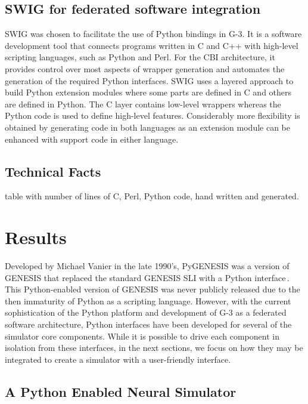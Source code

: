 \documentclass[12pt]{article}
\begin{document}
\subsection{SWIG for federated software integration}

SWIG was chosen to facilitate the use of Python bindings in G-3. It is
a software development tool that connects programs written in C and
C++ with high-level scripting languages, such as Python and Perl. For
the CBI architecture, it provides control over most aspects of wrapper
generation and automates the generation of the required Python
interfaces. SWIG uses a layered approach to build Python extension
modules where some parts are defined in C and
others are defined in Python. The C layer contains low-level wrappers
whereas the Python code is used to define high-level features.
Considerably more flexibility is obtained by generating code in both
languages as an extension module can be enhanced with support code in
either language.

\subsection{Technical Facts}

table with number of lines of C, Perl, Python code, hand written and
generated.

\section{Results}

Developed by Michael Vanier in the late 1990's, PyGENESIS was a
version of GENESIS that replaced the standard GENESIS SLI with a
Python interface\,\cite{vanier97:_genes_python}.  This Python-enabled
version of GENESIS was never publicly released due to the then
immaturity of Python as a scripting language.  However, with the
current sophistication of the Python platform and development of G-3
as a federated software architecture, Python interfaces have been
developed for several of the simulator core components.  While it is
possible to drive each component in isolation from these interfaces,
in the next sections, we focus on how they may be integrated to create
a simulator with a user-friendly interface.

\subsection{A Python Enabled Neural Simulator}
\label{ss-apens}
\end{document}
